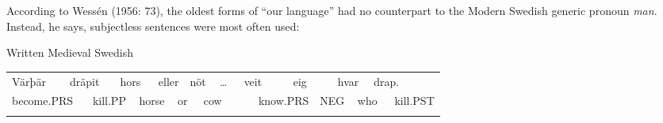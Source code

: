 \begin{styleBodytextC}
According to Wessén (1956: 73), the oldest forms of “our language” had no counterpart to the Modern Swedish generic pronoun \textit{man}. Instead, he says, subjectless sentences were most often used: 

\end{styleBodytextC}

\begin{listWWNumileveli}
\item 

\begin{styleExample}
Written Medieval Swedish

\end{styleExample}

\end{listWWNumileveli}

\begin{listWWNumxcleveli}
\item 

\end{listWWNumxcleveli}

\begin{tabular}{llllllllllllllllllll}
\lsptoprule
Värþär & \multicolumn{2}{l}{dräpit

} & \multicolumn{2}{l}{hors

} & \multicolumn{2}{l}{eller

} & \multicolumn{2}{l}{nöt

} & \multicolumn{2}{l}{…

} & \multicolumn{2}{l}{veit

} & \multicolumn{2}{l}{eig

} & \multicolumn{2}{l}{hvar

} & \multicolumn{2}{l}{drap.

} & \\
\multicolumn{2}{l}{become.PRS

} & \multicolumn{2}{l}{kill.PP

} & \multicolumn{2}{l}{horse

} & \multicolumn{2}{l}{or

} & \multicolumn{2}{l}{cow

} & \multicolumn{2}{l}{} & \multicolumn{2}{l}{know.PRS

} & \multicolumn{2}{l}{NEG

} & \multicolumn{2}{l}{who

} & \multicolumn{2}{l}{kill.PST

}\\
\lspbottomrule
\end{tabular}

